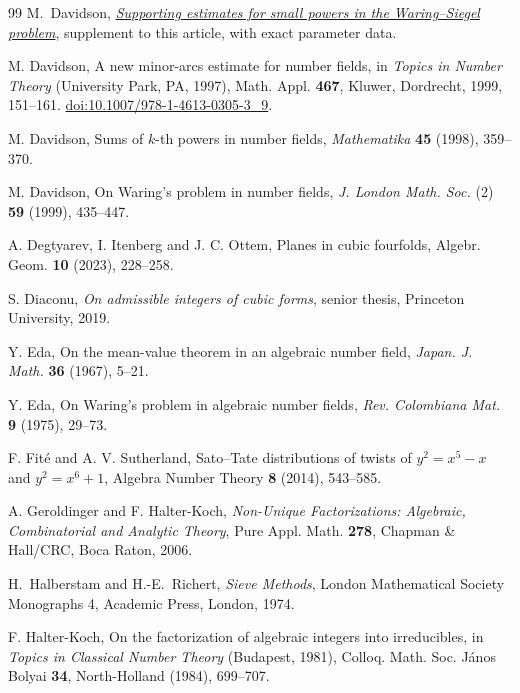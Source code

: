 \documentclass[11pt,letterpaper]{article}
\theoremstyle{definition}
\numberwithin{equation}{section}
\begin{document}
\begin{thebibliography}{99}
M.~Davidson, \href{https://github.com/morley988/warings-problem/blob/main/supplements/number-field/small-powers/waring-siegel_small_powers.pdf}{\emph{Supporting estimates for small powers in the Waring--Siegel problem}}, supplement to this article, with exact parameter data.

M. Davidson, A new minor-arcs estimate for number fields,
in \emph{Topics in Number Theory} (University Park, PA, 1997),
Math. Appl. \textbf{467}, Kluwer, Dordrecht, 1999, 151--161. \href{https://doi.org/10.1007/978-1-4613-0305-3_9}{doi:10.1007/978-1-4613-0305-3\_9}.

M. Davidson, Sums of $k$-th powers in number fields,
\emph{Mathematika} \textbf{45} (1998), 359--370.

M. Davidson, On Waring's problem in number fields,
\emph{J. London Math. Soc.} (2) \textbf{59} (1999), 435--447.

A. Degtyarev, I. Itenberg and J. C. Ottem, Planes in cubic fourfolds, Algebr. Geom. \textbf{10} (2023), 228--258.

S. Diaconu, \emph{On admissible integers of cubic forms}, senior thesis, Princeton University, 2019.

Y. Eda, On the mean-value theorem in an algebraic number field,
\emph{Japan. J. Math.} \textbf{36} (1967), 5--21.

Y. Eda, On Waring's problem in algebraic number fields,
\emph{Rev. Colombiana Mat.} \textbf{9} (1975), 29--73.

F. Fit\'e and A. V. Sutherland, Sato--Tate distributions of twists of $y^2=x^5-x$ and $y^2=x^6+1$, Algebra Number Theory \textbf{8} (2014), 543--585.

A. Geroldinger and F. Halter-Koch, \emph{Non-Unique Factorizations:
Algebraic, Combinatorial and Analytic Theory}, Pure Appl. Math.
\textbf{278}, Chapman \& Hall/CRC, Boca Raton, 2006.

H.~Halberstam and H.-E.~Richert, \emph{Sieve Methods},
London Mathematical Society Monographs 4, Academic Press, London, 1974.

F. Halter-Koch, On the factorization of algebraic integers into irreducibles,
in \emph{Topics in Classical Number Theory} (Budapest, 1981),
Colloq. Math. Soc. J\'anos Bolyai \textbf{34}, North-Holland (1984), 699--707.


\end{thebibliography}
\end{document}
